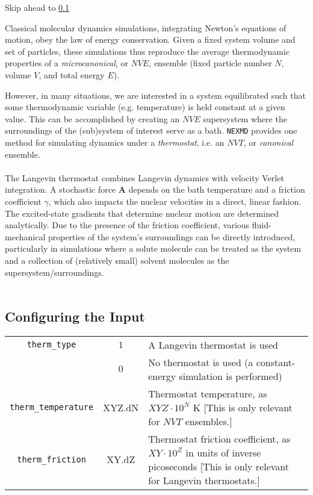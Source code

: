 \documentclass[12pt,letter,footinclude=true,headinclude=true,hyphens,oneside]{book} %
\begin{document}
    Skip ahead to \ref{thermo-input}
    
    Classical molecular dynamics simulations, integrating Newton's equations of motion, obey the law of energy conservation. Given a fixed system volume and set of particles, these simulations thus reproduce the average thermodynamic properties of a \emph{microcanonical}, or $NVE$, ensemble (fixed particle number $N$, volume $V$, and total energy $E$).
    
    However, in many situations, we are interested in a system equilibrated such that some thermodynamic variable (e.g. temperature) is held constant at a given value. This can be accomplished by creating an $NVE$ supersystem where the surroundings of the (sub)system of interest serve as a bath. \texttt{NEXMD} provides one method for simulating dynamics under a \emph{thermostat}, i.e. an $NVT$, or \emph{canonical} ensemble. \\ \\
    The Langevin thermostat combines Langevin dynamics with velocity Verlet integration. A stochastic force $\mathbf{A}$ depends on the bath temperature and a friction coefficient $\gamma$, which also impacts the nuclear velocities in a direct, linear fashion. The excited-state gradients that determine nuclear motion are determined analytically. Due to the presence of the friction coefficient, various fluid-mechanical properties of the system's surroundings can be directly introduced, particularly in simulations where a solute molecule can be treated as the system and a collection of (relatively small) solvent molecules as the supersystem/surroundings. \\ \\   
    
    \subsection{Configuring the Input}
    \label{thermo-input}
    
    \begin{tabular}{ | c | c | p{7cm} | }
    \hline
    \texttt{therm\_type} & $1$ & A Langevin thermostat is used \\
    & $0$ & No thermostat is used (a constant-energy simulation is performed) \\ \hline
    \texttt{therm\_temperature} & XYZ.dN & Thermostat temperature, as $XYZ \cdot 10^N$ K [This is only relevant for $NVT$ ensembles.]\\ \hline
    \texttt{therm\_friction} & XY.dZ & Thermostat friction coefficient, as $XY \cdot 10^Z$ in units of inverse picoseconds [This is only relevant for Langevin thermostats.] \\ \hline
    \end{tabular}
    
\end{document}
